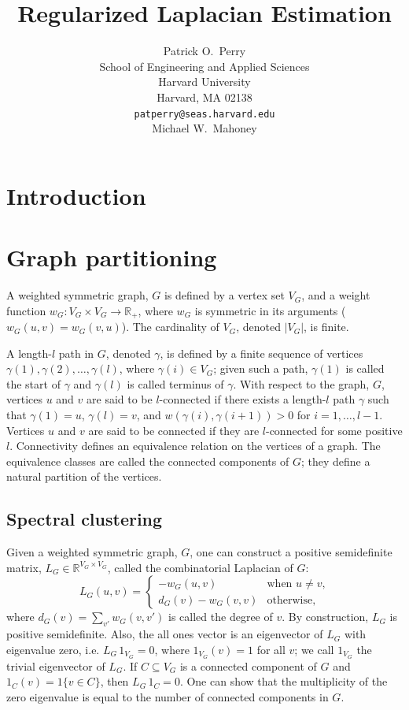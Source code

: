 \documentclass[12pt]{article}
\title{
  Regularized Laplacian Estimation
}
\author{
  Patrick O.~Perry \\
  School of Engineering and Applied Sciences \\
  Harvard University \\
  Harvard, MA 02138 \\
  \texttt{patperry@seas.harvard.edu} \\
  \And
  Michael W.\ Mahoney
}
\newcommand{\reals}{\mathbb{R}}
\theoremstyle{plain}
\begin{document}
\maketitle

\begin{abstract}
\end{abstract}

\section{Introduction}

\section{Graph partitioning}
\label{S:introduction}

A weighted symmetric graph, $G$ is defined by a vertex set $V_G$, and a
weight function $w_G : V_G \times V_G \to \reals_+$, where $w_G$ is symmetric
in its arguments ($w_G(u,v) = w_G(v,u)$).  The cardinality of $V_G$,
denoted $|V_G|$, is finite.

A length-$l$ path in $G$, denoted $\gamma$, is defined by a finite sequence of
vertices $\gamma(1), \gamma(2), \ldots, \gamma(l)$, where $\gamma(i) \in V_G$; given
such a path, $\gamma(1)$ is called the start of $\gamma$ and 
$\gamma(l)$ is called terminus of $\gamma$.  With respect to
the graph, $G$, vertices $u$ and $v$ are said to be $l$-connected if there
exists a length-$l$ path $\gamma$ such that $\gamma(1) = u$,
$\gamma(l) = v$, and $w(\gamma(i), \gamma(i+1)) > 0$ for $i = 1,
\ldots, l-1$.  Vertices $u$ and $v$ are said to be connected if they
are $l$-connected for some positive $l$.  Connectivity defines an
equivalence relation on the vertices of a graph.  The equivalence
classes are called the connected components of $G$; they define a
natural partition of the vertices.

\subsection{Spectral clustering}

Given a weighted symmetric graph, $G$, one can construct a positive
semidefinite matrix, $L_G \in \reals^{V_G \times V_G}$, called the combinatorial Laplacian of $G$:
\[
  L_G(u,v)
  =
  \begin{cases}
    - w_G(u,v) & \text{when $u \neq v$,} \\
    d_G(v) - w_G(v,v) & \text{otherwise,}
  \end{cases}
\]
where $d_G(v) = \sum_{v'} w_G(v,v')$ is called the degree of $v$.
By construction, $L_G$ is positive semidefinite.  Also, the all ones
vector is an eigenvector of $L_G$ with eigenvalue zero, i.e. $L_G \, 1_{V_G}
= 0$, where $1_{V_G}(v) = 1$ for all $v$; we call $1_{V_G}$ the
trivial eigenvector of $L_G$.  If $C \subseteq V_G$ is a connected component of
$G$ and $1_C(v) = 1\{ v \in C \}$, then $L_G \, 1_C = 0$.  One can
show that the multiplicity of the zero eigenvalue is equal to the
number of connected components in $G$.
\end{document}
